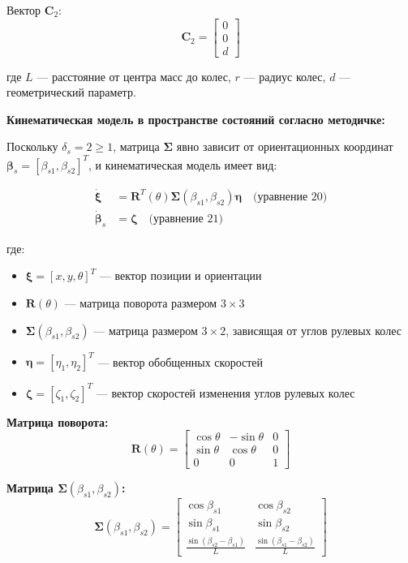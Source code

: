 Вектор $\mathbf{C}_2$:
$$\mathbf{C}_2 = \begin{bmatrix}
0 \\
0 \\
d
\end{bmatrix}$$

где $L$ --- расстояние от центра масс до колес, $r$ --- радиус колес, $d$ --- геометрический параметр.

\textbf{Кинематическая модель в пространстве состояний согласно методичке:}

Поскольку $\delta_s = 2 \geq 1$, матрица $\boldsymbol{\Sigma}$ явно зависит от ориентационных координат $\boldsymbol{\beta}_s = [\beta_{s1}, \beta_{s2}]^T$, и кинематическая модель имеет вид:

\begin{align}
\dot{\boldsymbol{\xi}} &= \mathbf{R}^T(\theta)\boldsymbol{\Sigma}(\beta_{s1}, \beta_{s2})\boldsymbol{\eta} \quad \text{(уравнение 20)} \\
\dot{\boldsymbol{\beta}}_s &= \boldsymbol{\zeta} \quad \text{(уравнение 21)}
\end{align}

где:
\begin{itemize}
\item $\boldsymbol{\xi} = [x, y, \theta]^T$ --- вектор позиции и ориентации
\item $\mathbf{R}(\theta)$ --- матрица поворота размером $3 \times 3$
\item $\boldsymbol{\Sigma}(\beta_{s1}, \beta_{s2})$ --- матрица размером $3 \times 2$, зависящая от углов рулевых колес
\item $\boldsymbol{\eta} = [\eta_1, \eta_2]^T$ --- вектор обобщенных скоростей
\item $\boldsymbol{\zeta} = [\zeta_1, \zeta_2]^T$ --- вектор скоростей изменения углов рулевых колес
\end{itemize}

\textbf{Матрица поворота:}
$$\mathbf{R}(\theta) = \begin{bmatrix}
\cos\theta & -\sin\theta & 0 \\
\sin\theta & \cos\theta & 0 \\
0 & 0 & 1
\end{bmatrix}$$

\textbf{Матрица $\boldsymbol{\Sigma}(\beta_{s1}, \beta_{s2})$:}
$$\boldsymbol{\Sigma}(\beta_{s1}, \beta_{s2}) = \begin{bmatrix}
\cos\beta_{s1} & \cos\beta_{s2} \\
\sin\beta_{s1} & \sin\beta_{s2} \\
\frac{\sin(\beta_{s2} - \beta_{s1})}{L} & \frac{\sin(\beta_{s1} - \beta_{s2})}{L}
\end{bmatrix}$$

